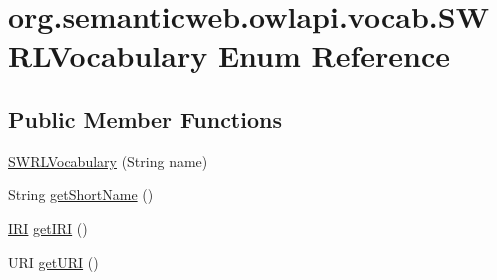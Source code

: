 \hypertarget{enumorg_1_1semanticweb_1_1owlapi_1_1vocab_1_1_s_w_r_l_vocabulary}{\section{org.\-semanticweb.\-owlapi.\-vocab.\-S\-W\-R\-L\-Vocabulary Enum Reference}
\label{enumorg_1_1semanticweb_1_1owlapi_1_1vocab_1_1_s_w_r_l_vocabulary}
}
\subsection*{Public Member Functions}
\begin{DoxyCompactItemize}
\item 
\hyperlink{enumorg_1_1semanticweb_1_1owlapi_1_1vocab_1_1_s_w_r_l_vocabulary_a855a618d3caa77278a204dd70a8f79cf}{S\-W\-R\-L\-Vocabulary} (String name)
\item 
String \hyperlink{enumorg_1_1semanticweb_1_1owlapi_1_1vocab_1_1_s_w_r_l_vocabulary_a7f5d78d546007c93b2f1e2ca5c5e2323}{get\-Short\-Name} ()
\item 
\hyperlink{classorg_1_1semanticweb_1_1owlapi_1_1model_1_1_i_r_i}{I\-R\-I} \hyperlink{enumorg_1_1semanticweb_1_1owlapi_1_1vocab_1_1_s_w_r_l_vocabulary_a42291425c190c866020e9cbf42f0d31e}{get\-I\-R\-I} ()
\item 
U\-R\-I \hyperlink{enumorg_1_1semanticweb_1_1owlapi_1_1vocab_1_1_s_w_r_l_vocabulary_ac44462459cc78645efa017f964f260e2}{get\-U\-R\-I} ()
\end{DoxyCompactItemize}
